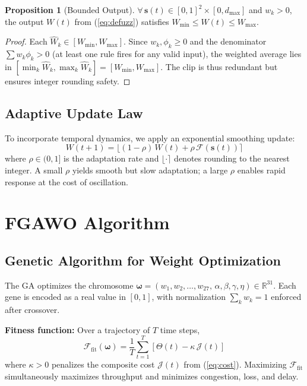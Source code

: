 \documentclass[10pt, twocolumn]{IEEEtran}
\theoremstyle{definition}
\newtheorem{proposition}{Proposition}
\begin{document}
\begin{proposition}[Bounded Output]
$\forall\, \mathbf{s}(t) \in [0,1]^2 \times [0, d_{\max}]$ and $w_k > 0$, the output $W(t)$ from (\ref{eq:defuzz}) satisfies $W_{\min} \leq W(t) \leq W_{\max}$.
\end{proposition}
\begin{proof}
Each $\hat{W}_k \in [W_{\min}, W_{\max}]$. Since $w_k, \phi_k \geq 0$ and the denominator $\sum w_k \phi_k > 0$ (at least one rule fires for any valid input), the weighted average lies in $[\min_k \hat{W}_k, \max_k \hat{W}_k] = [W_{\min}, W_{\max}]$. The clip is thus redundant but ensures integer rounding safety.
\end{proof}

\subsection{Adaptive Update Law}

To incorporate temporal dynamics, we apply an exponential smoothing update:
\begin{equation}
  W(t+1) = \lfloor (1-\rho)\, W(t) + \rho\, \mathcal{F}(\mathbf{s}(t)) \rceil
  \label{eq:update}
\end{equation}
where $\rho \in (0,1]$ is the adaptation rate and $\lfloor \cdot \rceil$ denotes rounding to the nearest integer. A small $\rho$ yields smooth but slow adaptation; a large $\rho$ enables rapid response at the cost of oscillation.

\section{FGAWO Algorithm}
\label{sec:algorithm}

\subsection{Genetic Algorithm for Weight Optimization}
\label{sec:ga}

The GA optimizes the chromosome $\boldsymbol{\omega} = (w_1, w_2, \ldots, w_{27},\, \alpha, \beta, \gamma, \eta) \in \mathbb{R}^{31}$. Each gene is encoded as a real value in $[0, 1]$, with normalization $\sum_{k}\! w_k = 1$ enforced after crossover.

\textbf{Fitness function:} Over a trajectory of $T$ time steps,
\begin{equation}
  \mathcal{F}_{\text{fit}}(\boldsymbol{\omega}) = \frac{1}{T}\sum_{t=1}^{T}\left[\Theta(t) - \kappa\, \mathcal{J}(t)\right]
  \label{eq:fitness}
\end{equation}
where $\kappa > 0$ penalizes the composite cost $\mathcal{J}(t)$ from (\ref{eq:cost}). Maximizing $\mathcal{F}_{\text{fit}}$ simultaneously maximizes throughput and minimizes congestion, loss, and delay.
\end{document}
